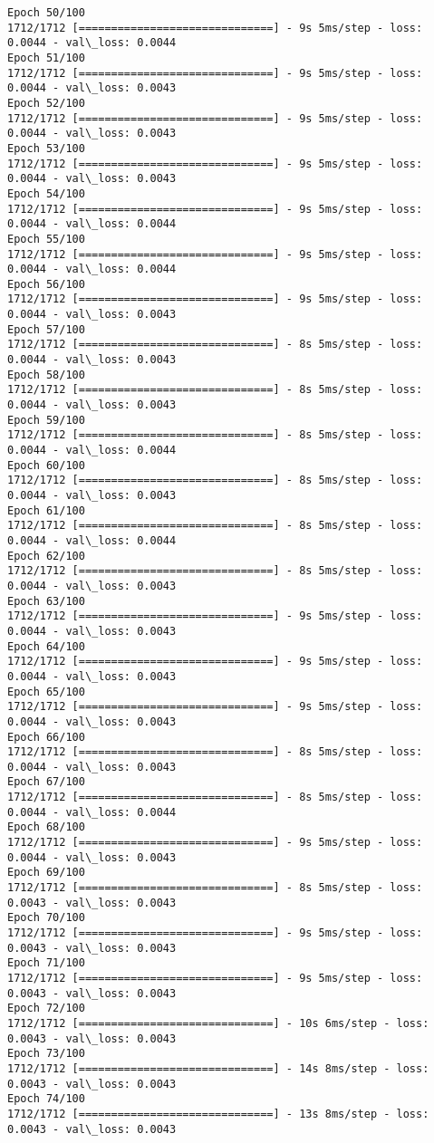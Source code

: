 \documentclass[11pt]{article}
\begin{document}
\begin{Verbatim}[commandchars=\\\{\}]
Epoch 50/100
1712/1712 [==============================] - 9s 5ms/step - loss: 0.0044 - val\_loss: 0.0044
Epoch 51/100
1712/1712 [==============================] - 9s 5ms/step - loss: 0.0044 - val\_loss: 0.0043
Epoch 52/100
1712/1712 [==============================] - 9s 5ms/step - loss: 0.0044 - val\_loss: 0.0043
Epoch 53/100
1712/1712 [==============================] - 9s 5ms/step - loss: 0.0044 - val\_loss: 0.0043
Epoch 54/100
1712/1712 [==============================] - 9s 5ms/step - loss: 0.0044 - val\_loss: 0.0044
Epoch 55/100
1712/1712 [==============================] - 9s 5ms/step - loss: 0.0044 - val\_loss: 0.0044
Epoch 56/100
1712/1712 [==============================] - 9s 5ms/step - loss: 0.0044 - val\_loss: 0.0043
Epoch 57/100
1712/1712 [==============================] - 8s 5ms/step - loss: 0.0044 - val\_loss: 0.0043
Epoch 58/100
1712/1712 [==============================] - 8s 5ms/step - loss: 0.0044 - val\_loss: 0.0043
Epoch 59/100
1712/1712 [==============================] - 8s 5ms/step - loss: 0.0044 - val\_loss: 0.0044
Epoch 60/100
1712/1712 [==============================] - 8s 5ms/step - loss: 0.0044 - val\_loss: 0.0043
Epoch 61/100
1712/1712 [==============================] - 8s 5ms/step - loss: 0.0044 - val\_loss: 0.0044
Epoch 62/100
1712/1712 [==============================] - 8s 5ms/step - loss: 0.0044 - val\_loss: 0.0043
Epoch 63/100
1712/1712 [==============================] - 9s 5ms/step - loss: 0.0044 - val\_loss: 0.0043
Epoch 64/100
1712/1712 [==============================] - 9s 5ms/step - loss: 0.0044 - val\_loss: 0.0043
Epoch 65/100
1712/1712 [==============================] - 9s 5ms/step - loss: 0.0044 - val\_loss: 0.0043
Epoch 66/100
1712/1712 [==============================] - 8s 5ms/step - loss: 0.0044 - val\_loss: 0.0043
Epoch 67/100
1712/1712 [==============================] - 8s 5ms/step - loss: 0.0044 - val\_loss: 0.0044
Epoch 68/100
1712/1712 [==============================] - 9s 5ms/step - loss: 0.0044 - val\_loss: 0.0043
Epoch 69/100
1712/1712 [==============================] - 8s 5ms/step - loss: 0.0043 - val\_loss: 0.0043
Epoch 70/100
1712/1712 [==============================] - 9s 5ms/step - loss: 0.0043 - val\_loss: 0.0043
Epoch 71/100
1712/1712 [==============================] - 9s 5ms/step - loss: 0.0043 - val\_loss: 0.0043
Epoch 72/100
1712/1712 [==============================] - 10s 6ms/step - loss: 0.0043 - val\_loss: 0.0043
Epoch 73/100
1712/1712 [==============================] - 14s 8ms/step - loss: 0.0043 - val\_loss: 0.0043
Epoch 74/100
1712/1712 [==============================] - 13s 8ms/step - loss: 0.0043 - val\_loss: 0.0043

\end{Verbatim}
\end{document}
